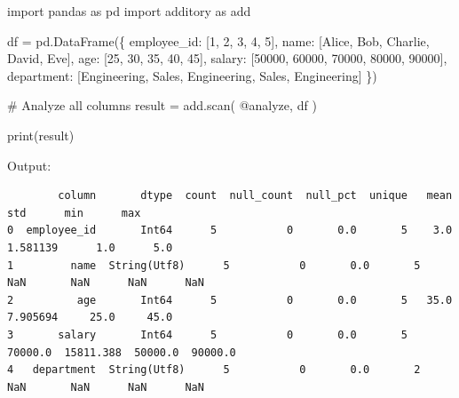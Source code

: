 \documentclass[
  letterpaper,
]{scrbook}
\newenvironment{Shaded}{\begin{snugshade}}{\end{snugshade}}
\newcommand{\BuiltInTok}[1]{\textcolor[rgb]{0.00,0.23,0.31}{#1}}
\newcommand{\CommentTok}[1]{\textcolor[rgb]{0.37,0.37,0.37}{#1}}
\newcommand{\DecValTok}[1]{\textcolor[rgb]{0.68,0.00,0.00}{#1}}
\newcommand{\ImportTok}[1]{\textcolor[rgb]{0.00,0.46,0.62}{#1}}
\newcommand{\NormalTok}[1]{\textcolor[rgb]{0.00,0.23,0.31}{#1}}
\newcommand{\OperatorTok}[1]{\textcolor[rgb]{0.37,0.37,0.37}{#1}}
\newcommand{\StringTok}[1]{\textcolor[rgb]{0.13,0.47,0.30}{#1}}
\begin{document}
\begin{Shaded}
\begin{Highlighting}[]
\ImportTok{import}\NormalTok{ pandas }\ImportTok{as}\NormalTok{ pd}
\ImportTok{import}\NormalTok{ additory }\ImportTok{as}\NormalTok{ add}

\NormalTok{df }\OperatorTok{=}\NormalTok{ pd.DataFrame(\{}
    \StringTok{\textquotesingle{}employee\_id\textquotesingle{}}\NormalTok{: [}\DecValTok{1}\NormalTok{, }\DecValTok{2}\NormalTok{, }\DecValTok{3}\NormalTok{, }\DecValTok{4}\NormalTok{, }\DecValTok{5}\NormalTok{],}
    \StringTok{\textquotesingle{}name\textquotesingle{}}\NormalTok{: [}\StringTok{\textquotesingle{}Alice\textquotesingle{}}\NormalTok{, }\StringTok{\textquotesingle{}Bob\textquotesingle{}}\NormalTok{, }\StringTok{\textquotesingle{}Charlie\textquotesingle{}}\NormalTok{, }\StringTok{\textquotesingle{}David\textquotesingle{}}\NormalTok{, }\StringTok{\textquotesingle{}Eve\textquotesingle{}}\NormalTok{],}
    \StringTok{\textquotesingle{}age\textquotesingle{}}\NormalTok{: [}\DecValTok{25}\NormalTok{, }\DecValTok{30}\NormalTok{, }\DecValTok{35}\NormalTok{, }\DecValTok{40}\NormalTok{, }\DecValTok{45}\NormalTok{],}
    \StringTok{\textquotesingle{}salary\textquotesingle{}}\NormalTok{: [}\DecValTok{50000}\NormalTok{, }\DecValTok{60000}\NormalTok{, }\DecValTok{70000}\NormalTok{, }\DecValTok{80000}\NormalTok{, }\DecValTok{90000}\NormalTok{],}
    \StringTok{\textquotesingle{}department\textquotesingle{}}\NormalTok{: [}\StringTok{\textquotesingle{}Engineering\textquotesingle{}}\NormalTok{, }\StringTok{\textquotesingle{}Sales\textquotesingle{}}\NormalTok{, }\StringTok{\textquotesingle{}Engineering\textquotesingle{}}\NormalTok{, }\StringTok{\textquotesingle{}Sales\textquotesingle{}}\NormalTok{, }\StringTok{\textquotesingle{}Engineering\textquotesingle{}}\NormalTok{]}
\NormalTok{\})}

\CommentTok{\# Analyze all columns}
\NormalTok{result }\OperatorTok{=}\NormalTok{ add.scan(}
    \StringTok{\textquotesingle{}@analyze\textquotesingle{}}\NormalTok{,}
\NormalTok{    df}
\NormalTok{)}

\BuiltInTok{print}\NormalTok{(result)}
\end{Highlighting}
\end{Shaded}

Output:

\begin{verbatim}
        column       dtype  count  null_count  null_pct  unique   mean       std      min      max
0  employee_id       Int64      5           0       0.0       5    3.0  1.581139      1.0      5.0
1         name  String(Utf8)      5           0       0.0       5    NaN       NaN      NaN      NaN
2          age       Int64      5           0       0.0       5   35.0  7.905694     25.0     45.0
3       salary       Int64      5           0       0.0       5  70000.0  15811.388  50000.0  90000.0
4   department  String(Utf8)      5           0       0.0       2    NaN       NaN      NaN      NaN
\end{verbatim}
\end{document}
